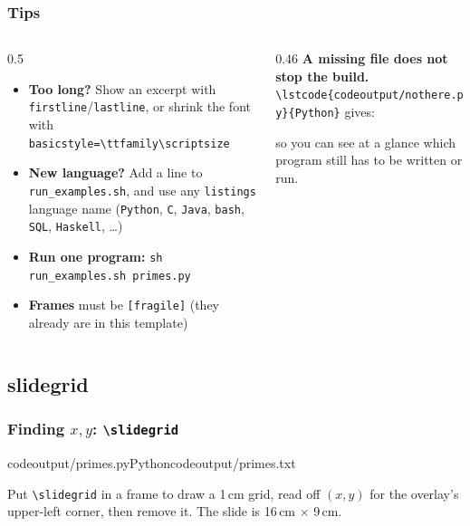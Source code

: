 \documentclass[aspectratio=169,10pt,compress]{beamer}
\newcommand{\cmd}[1]{\texttt{\color{gitred}#1}}
\begin{document}
\begin{frame}[t,fragile] \frametitle{Tips}
  \begin{columns}[T]
    \begin{column}{0.5\textwidth}
      \begin{itemize}\small
        \item \textbf{Too long?} Show an excerpt with \texttt{firstline}/\texttt{lastline},
              or shrink the font with \texttt{basicstyle=\textbackslash ttfamily\textbackslash scriptsize}
        \item \textbf{New language?} Add a line to \texttt{run\_examples.sh}, and use any
              \texttt{listings} language name (\texttt{Python}, \texttt{C}, \texttt{Java},
              \texttt{bash}, \texttt{SQL}, \texttt{Haskell}, \dots)
        \item \textbf{Run one program:} \cmd{sh run\_examples.sh primes.py}
        \item \textbf{Frames} must be \texttt{[fragile]} (they already are in this template)
      \end{itemize}
    \end{column}
    \begin{column}{0.46\textwidth}
      \small \textbf{A missing file does not stop the build.}
      \verb|\lstcode{codeoutput/nothere.py}{Python}| gives:
      \vspace{0.3em}


      \small so you can see at a glance which program still has to be written or run.
    \end{column}
  \end{columns}
\end{frame}




\subsection[slidegrid]{slidegrid}




\begin{frame}[t,fragile] \frametitle{Finding $x,y$: \texttt{\textbackslash slidegrid}}
  \slidegrid
  \lstcodeoverlaystep[basicstyle=\ttfamily\scriptsize][][0.4\textwidth]{8.9cm,2.1cm}%
    {codeoutput/primes.py}{Python}{codeoutput/primes.txt}

  \small Put \verb|\slidegrid| in a frame to draw a 1\,cm grid, read off $(x,y)$ for the
  overlay's upper-left corner, then remove it. The slide is 16\,cm $\times$ 9\,cm.
\end{frame}
\end{document}

